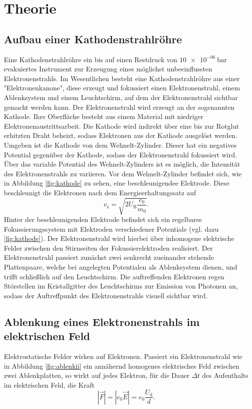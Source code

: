 \section{Theorie}
\label{sec:Theorie}
\subsection{Aufbau einer Kathodenstrahlröhre}
Eine Kathodenstrahlröhre ein bis auf einen Restdruck von $\SI{10e-06}{\bar}$ evakuiertes Instrument zur Erzeugung eines möglichst unbeeinflussten Elektronenstrahls.
Im Wesentlichen besteht eine Kathodenstrahlröhre aus einer "Elektronenkanone", diese erzeugt und fokussiert einen Elektronenstrahl, einem Ablenksystem und einem Leuchtschirm, auf dem der Elektronenstrahl sichtbar gemacht werden kann.
Der Elektronenstrahl wird erzeugt an der sogenannten Kathode. Ihre Oberfläche besteht aus einem Material mit niedriger Elektronenaustrittsarbeit.
Die Kathode wird indirekt über eine bis zur Rotglut erhitzten Draht beheizt, sodass
Elektronen aus der Kathode ausgelöst werden.
Umgeben ist die Kathode von dem Wehnelt-Zylinder. Dieser hat ein negatives Potential gegenüber der Kathode, sodass der Elektronenstrahl fokussiert wird. Über das variable Potential des Wehnelt-Zylinders ist es möglich, die Intensität des Elektronenstrahls zu variieren.
Vor dem Wehnelt-Zylinder befindet sich, wie in Abbildung \ref{fig:kathode} zu sehen, eine beschleunigendee Elektrode. Diese beschleunigt die Elektronen nach dem Energieerhaltungssatz auf
\begin{equation}
  \label{eqn:speedy}
  v_\mathrm{z}=\sqrt{2U_\mathrm{B}\frac{e_0}{m_0}} \text{.}
\end{equation}
Hinter der beschleunigenden Elektrode befindet sich ein regelbares Fokussierungssystem mit Elektroden verschiedener Potentiale (vgl. dazu \ref{fig:kathode}).
Der Elektronenstrahl wird hierbei über inhomogene elektrische Felder zwischen den Stirnseiten der Fokussierelektroden realisiert.
Der Elektronenstrahl passiert zunächst zwei senkrecht zueinander stehende Plattenpaare, welche bei angelegten Potentialen als Ablenksystem dienen, und trifft schließlich auf den Leuchtschirm. Die auftreffenden Elektronen regen Störstellen im Kristallgitter des Leuchtschirms zur Emission von Photonen an, sodass der Auftreffpunkt des Elektronenstrahls visuell sichtbar wird.
\subsection{Ablenkung eines Elektronenstrahls im elektrischen Feld}
Elektrostatische Felder wirken auf Elektronen. Passiert ein Elektronenstrahl wie in Abbildung \ref{fig:ablenkii} ein annähernd homogenes elektrisches Feld zwischen zwei Ablenkplatten, so wirkt auf jedes Elektron, für die Dauer $\Delta t$ des Aufenthalts im elektrischen Feld, die Kraft
\begin{equation}
  |\vec{F}|=|e_0\vec{E}|=e_0\frac{U_\mathrm{d}}{d}\text{.}
\end{equation}

